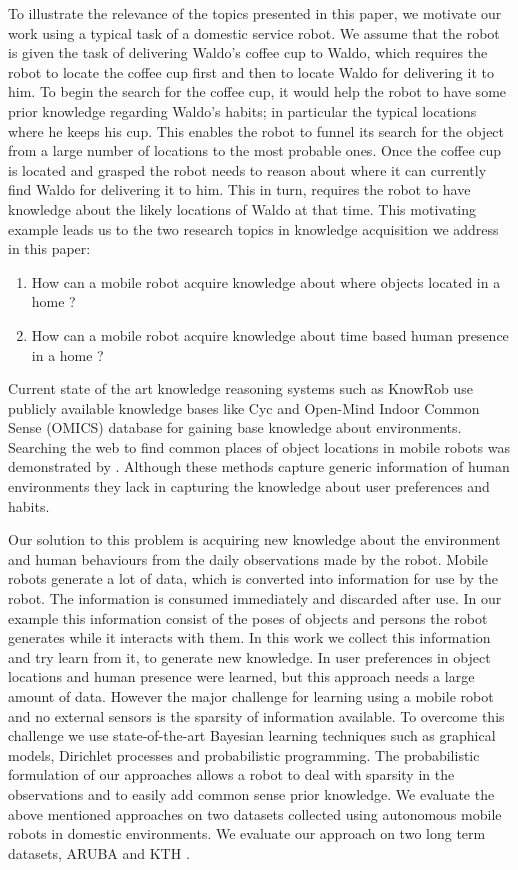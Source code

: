 \documentclass[a4paper, 10pt, conference]{ieeeconf}      %
\begin{document}
To illustrate the relevance of the topics presented in this paper, we motivate our work using a typical task of a domestic service robot.   We assume that the robot is given the task of delivering Waldo's coffee cup to Waldo, which requires the robot to locate the coffee cup first and then to locate Waldo for delivering it to him. To begin the search for the coffee cup, it would help the robot to have some prior knowledge regarding Waldo's habits; in particular the typical locations where he keeps his cup. This enables the robot to funnel its search for the object from a large number of locations to the most probable ones. Once the coffee cup is located and grasped the robot needs to reason about where it can currently find Waldo for delivering it to him. This in turn, requires the robot to have knowledge about the likely locations of Waldo at that time.
This motivating example leads us to the two research topics in knowledge acquisition we address in this paper:
\begin{enumerate}
	\item How can a mobile robot acquire knowledge about where objects located in a home ?
	\item How can a mobile robot acquire knowledge about time based human presence in a home ?
\end{enumerate}

Current state of the art knowledge reasoning systems such as KnowRob \cite{c1} use publicly available knowledge bases like Cyc \cite{c2} and Open-Mind Indoor Common Sense (OMICS) database \cite{c3} for gaining base knowledge about environments.  Searching the web to find common places of object locations in mobile robots was demonstrated by \cite{c4}. Although these methods capture generic information of human environments they lack in capturing the knowledge about user preferences and habits. 

Our solution to this problem is acquiring new knowledge about the environment and human behaviours from the daily observations made by the robot. Mobile robots generate a lot of data, which is converted into information for use by the robot. The information is consumed immediately and discarded after use. In our example this information consist of the poses of objects and persons the robot generates while it interacts with them. In this work we collect this information and try learn from it, to generate new knowledge. In \cite{c5} user preferences in object locations and human presence were learned, but this approach needs a large amount of data. However the major challenge for learning using a mobile robot and no external sensors is the sparsity of information available. To overcome this challenge we use state-of-the-art  Bayesian  learning techniques such as graphical models, Dirichlet processes and probabilistic programming.    The  probabilistic  formulation of our approaches allows a robot to deal with sparsity in the observations and to easily add common sense prior knowledge.  We evaluate the above mentioned approaches on two datasets collected using autonomous mobile robots in domestic environments.  We evaluate our approach on two long term datasets, ARUBA \cite{c6} and KTH \cite{c5}. 
\end{document}
